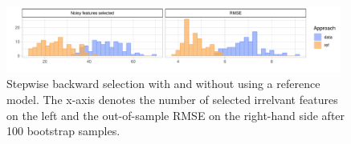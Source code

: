 \documentclass[american,]{article}
\theoremstyle{definition}
\begin{document}



\begin{figure}[tp]
  \centering
  \includegraphics[width=0.98\textwidth]{graphics/bodyfat_step_refvsdata.pdf}
  \caption{Stepwise backward selection with and without using a reference model. The x-axis denotes the number of selected irrelvant features on the left and the out-of-sample RMSE on the right-hand side after 100 bootstrap samples.\\}
  \label{fig:bodyfat_step_refvsdata}
\end{figure}
\end{document}
